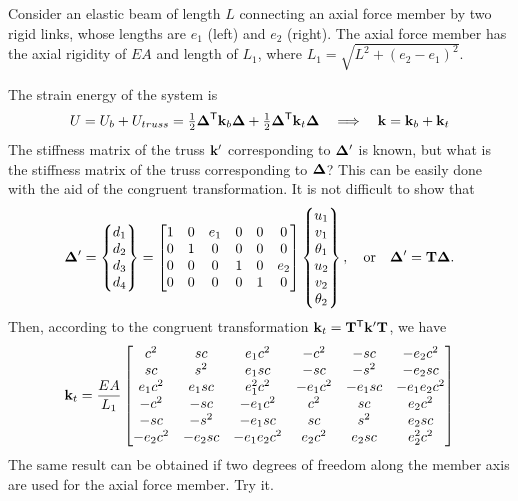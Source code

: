 \begin{example}
Consider an elastic beam of length $L$ connecting an axial force member by two rigid links, whose lengths are $e_1$ (left) and $e_2$ (right). The axial force member has the axial rigidity of $EA$ and length of $L_1$, where $L_1 = \sqrt{L^2+(e_2-e_1)^2}$.
\begin{fig}
  
\end{fig}
The strain energy of the system is
\begin{equation*}
  U = U_b + U_{truss} = \tfrac12\bm{\Delta}^{\mathsf{T}}\mathbf{k}_b\bm{\Delta} + \tfrac12\bm{\Delta}^{\mathsf{T}}\mathbf{k}_t\bm{\Delta}
  \quad\Longrightarrow\quad \mathbf{k} = \mathbf{k}_b + \mathbf{k}_t
\end{equation*}
The stiffness matrix of the truss $\mathbf{k}'$ corresponding to $\bm{\Delta}'$ is known, but what is the stiffness matrix of the truss corresponding to $\bm{\Delta}$? This can be easily done with the aid of the congruent transformation. It is not difficult to show that
\begin{equation*}
  \bm{\Delta}' = \begin{Bmatrix}d_1\\ d_2\\ d_3\\ d_4\end{Bmatrix} =
  \begin{bmatrix}1 & 0 & e_1 & 0 & 0 & 0\\ 0 & 1 & 0 & 0 & 0 & 0\\ 0 & 0 & 0 & 1 & 0 & e_2\\ 0 & 0 & 0 & 0 & 1 & 0\end{bmatrix}
  \begin{Bmatrix}u_1\\ v_1\\ \theta_1\\ u_2\\ v_2\\ \theta_2\end{Bmatrix},\quad\text{or}\quad \bm{\Delta}' = \mathbf{T}\bm{\Delta}.
\end{equation*}
Then, according to the congruent transformation $\mathbf{k}_t = \mathbf{T}^{\mathsf{T}}\mathbf{k}'\mathbf{T}$, we have
\begin{equation*}
  \mathbf{k}_t = \frac{EA}{L_1}
  \begin{bmatrix}
    c^2 & sc & e_1c^2 & -c^2 & -sc & -e_2c^2\\
    sc & s^2 & e_1sc & -sc & -s^2 & -e_2sc\\
    e_1c^2 & e_1sc & e_1^2c^2 & -e_1c^2 & -e_1sc & -e_1e_2c^2\\
    -c^2 & -sc & -e_1c^2 & c^2 & sc & e_2c^2\\
    -sc & -s^2 & -e_1sc & sc & s^2 & e_2sc\\
    -e_2c^2 & -e_2sc & -e_1e_2c^2 & e_2c^2 & e_2sc & e_2^2c^2
  \end{bmatrix}
\end{equation*}
The same result can be obtained if two degrees of freedom along the member axis are used for the axial force member. Try it.
\end{example}

